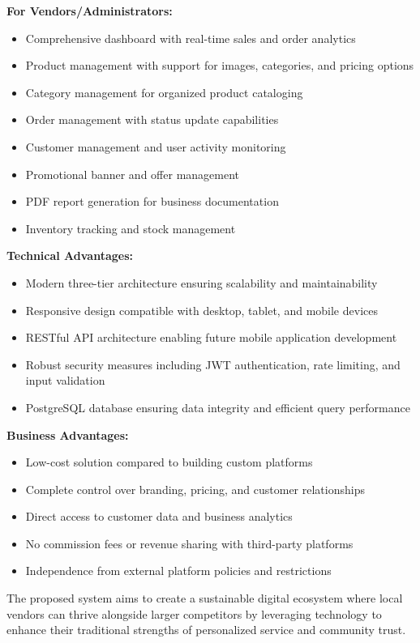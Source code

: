 \documentclass[12pt,a4paper]{report}
\begin{document}
\textbf{For Vendors/Administrators:}
\begin{itemize}
    \item Comprehensive dashboard with real-time sales and order analytics
    \item Product management with support for images, categories, and pricing options
    \item Category management for organized product cataloging
    \item Order management with status update capabilities
    \item Customer management and user activity monitoring
    \item Promotional banner and offer management
    \item PDF report generation for business documentation
    \item Inventory tracking and stock management
\end{itemize}

\textbf{Technical Advantages:}
\begin{itemize}
    \item Modern three-tier architecture ensuring scalability and maintainability
    \item Responsive design compatible with desktop, tablet, and mobile devices
    \item RESTful API architecture enabling future mobile application development
    \item Robust security measures including JWT authentication, rate limiting, and input validation
    \item PostgreSQL database ensuring data integrity and efficient query performance
\end{itemize}

\textbf{Business Advantages:}
\begin{itemize}
    \item Low-cost solution compared to building custom platforms
    \item Complete control over branding, pricing, and customer relationships
    \item Direct access to customer data and business analytics
    \item No commission fees or revenue sharing with third-party platforms
    \item Independence from external platform policies and restrictions
\end{itemize}

The proposed system aims to create a sustainable digital ecosystem where local vendors can thrive alongside larger competitors by leveraging technology to enhance their traditional strengths of personalized service and community trust.
\end{document}
